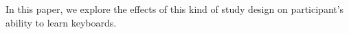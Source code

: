 In this paper, we explore the effects of this kind of study design on participant's ability to learn keyboards.



